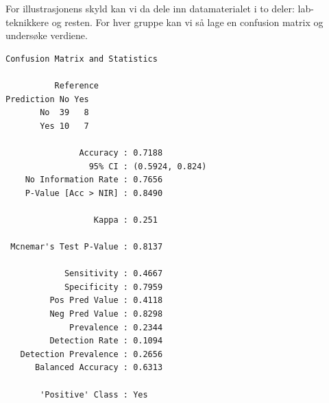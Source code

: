 \documentclass[
  letterpaper,
  DIV=11,
  numbers=noendperiod]{scrreprt}
\newenvironment{Shaded}{\begin{snugshade}}{\end{snugshade}}
\newcommand{\AttributeTok}[1]{\textcolor[rgb]{0.40,0.45,0.13}{#1}}
\newcommand{\FunctionTok}[1]{\textcolor[rgb]{0.28,0.35,0.67}{#1}}
\newcommand{\NormalTok}[1]{\textcolor[rgb]{0.00,0.23,0.31}{#1}}
\newcommand{\OtherTok}[1]{\textcolor[rgb]{0.00,0.23,0.31}{#1}}
\newcommand{\SpecialCharTok}[1]{\textcolor[rgb]{0.37,0.37,0.37}{#1}}
\newcommand{\StringTok}[1]{\textcolor[rgb]{0.13,0.47,0.30}{#1}}
\begin{document}
For illustrasjonens skyld kan vi da dele inn datamaterialet i to deler:
lab-teknikkere og resten. For hver gruppe kan vi så lage en confusion
matrix og undersøke verdiene.

\begin{Shaded}
\end{Shaded}

\begin{verbatim}
Confusion Matrix and Statistics

          Reference
Prediction No Yes
       No  39   8
       Yes 10   7
                                         
               Accuracy : 0.7188         
                 95% CI : (0.5924, 0.824)
    No Information Rate : 0.7656         
    P-Value [Acc > NIR] : 0.8490         
                                         
                  Kappa : 0.251          
                                         
 Mcnemar's Test P-Value : 0.8137         
                                         
            Sensitivity : 0.4667         
            Specificity : 0.7959         
         Pos Pred Value : 0.4118         
         Neg Pred Value : 0.8298         
             Prevalence : 0.2344         
         Detection Rate : 0.1094         
   Detection Prevalence : 0.2656         
      Balanced Accuracy : 0.6313         
                                         
       'Positive' Class : Yes            
                                         
\end{verbatim}
\end{document}
